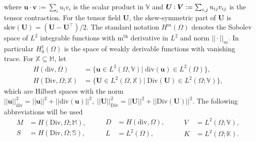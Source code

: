 \documentclass{ifacconf}
\def\onedot{$\mathsurround0pt\ldotp$}
\def\cddot{%
	\mathbin{\vcenter{\baselineskip.67ex
			\hbox{\onedot}\hbox{\onedot}}%
}}
\begin{document}
where $\bm{u} \cdot \bm{v} := \sum_{i} u_{i} v_{i}$ is the scalar product in $\mathbb{V}$ and $\bm{U} \cddot \bm{V} := \sum_{i,j} u_{ij} v_{ij}$ is the tensor contraction.
For the tensor field $\bm{U}$, the skew-symmetric part of $\bm{U}$ is $\mathrm{skw}(\bm{U}) = (\bm{U} - \bm{U}^\top)/2$. The standard notation $H^m(\Omega)$ denotes the Sobolev space of $L^2$ integrable functions with  m$^\text{th}$ derivative in $L^2$ and norm $||\cdot||_m$. In particular $H^1_0(\Omega)$ is the space of weakly derivable functions with vanishing trace. For $\mathbb{X} \subseteq \mathbb{M}$, let
\begin{equation*}
\begin{aligned}
H(\mathrm{div}, \Omega) &= \{\bm{u} \in L^2(\Omega, \mathbb{V}) \vert \; \mathrm{div}(\bm{u}) \in L^2(\Omega) \}, \\
H(\mathrm{Div}, \Omega; \mathbb{X}) &= \{\bm{U} \in L^2(\Omega, \mathbb{X}) \vert \; \mathrm{Div}(\bm{U}) \in L^2(\Omega; \mathbb{V}) \},
\end{aligned}
\end{equation*}
which are Hilbert spaces with the norm $||\bm{u}||^2_{\text{div}} = ||\bm{u}||^2 + ||\mathrm{div}(\bm{u})||^2, \; ||\bm{U}||^2_{\text{Div}} = ||\bm{U}||^2 + ||\mathrm{Div}(\bm{U})||^2$. The following abbreviations will be used
\begin{equation*}
\begin{aligned}
M &= H(\mathrm{Div}, \Omega; \mathbb{M}), \\
S &= H(\mathrm{Div}, \Omega; \mathbb{S}),
\end{aligned} \qquad
\begin{aligned}
D &= H(\mathrm{div}, \Omega), \\
L &= L^2(\Omega),
\end{aligned} \qquad
\begin{aligned}
V &= L^2(\Omega; \mathbb{V}), \\
K &= L^2(\Omega; \mathbb{K}).
\end{aligned}
\end{equation*}
\end{document}

